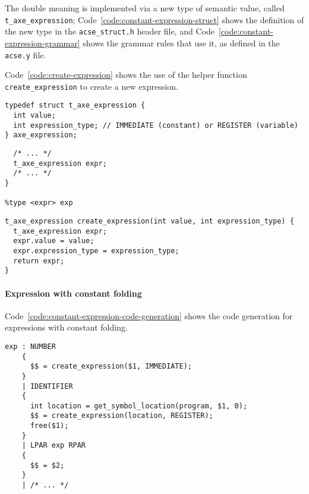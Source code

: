 The double meaning is implemented via a new type of semantic value, called \texttt{t\_axe\_expression};
Code~\ref{code:constant-expression-struct} shows the definition of the new type in the \texttt{acse\_struct.h} header file, and Code~\ref{code:constant-expression-grammar} shows the grammar rules that use it, as defined in the \texttt{acse.y} file.

Code~\ref{code:create-expression} shows the use of the helper function \texttt{create\_expression} to create a new expression.

\begin{onepage}
  \begin{lstlisting}[language=LANCE, caption={Constant expression struct in \texttt{acse\_struct.h}}, label={code:constant-expression-struct}]
typedef struct t_axe_expression {
  int value;
  int expression_type; // IMMEDIATE (constant) or REGISTER (variable)
} axe_expression;
\end{lstlisting}
\end{onepage}

\begin{onepage}
  \begin{lstlisting}[language=LANCE, caption={Constant expression grammar rules in \texttt{acse.y}}, label={code:constant-expression-grammar}]
%union {
  /* ... */
  t_axe_expression expr;
  /* ... */
}

%type <expr> exp
\end{lstlisting}
\end{onepage}

\begin{onepage}
  \begin{lstlisting}[language=LANCE, caption={Helper function to create a new expression in \texttt{acse\_struct.h}}, label={code:create-expression}]
t_axe_expression create_expression(int value, int expression_type) {
  t_axe_expression expr;
  expr.value = value;
  expr.expression_type = expression_type;
  return expr;
}
\end{lstlisting}
\end{onepage}

\paragraph*{Expression with constant folding}

Code~\ref{code:constant-expression-code-generation} shows the code generation for expressions with constant folding.

\begin{onepage}
  \begin{lstlisting}[language=LANCE, caption={Expression with constant folding code generation}, label={code:constant-expression-code-generation}]
exp : NUMBER
    {
      $$ = create_expression($1, IMMEDIATE);
    }
    | IDENTIFIER
    {
      int location = get_symbol_location(program, $1, 0);
      $$ = create_expression(location, REGISTER);
      free($1);
    }
    | LPAR exp RPAR
    {
      $$ = $2;
    }
    | /* ... */
\end{lstlisting}
\end{onepage}

